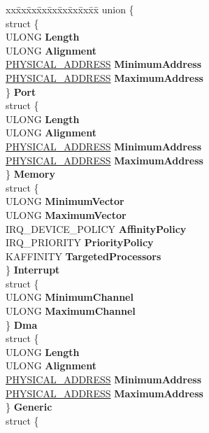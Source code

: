 \begin{DoxyCompactItemize}
\begin{tabbing}
xx\=xx\=xx\=xx\=xx\=xx\=xx\=xx\=xx\=\kill
union \{\\
\>struct \{\\
\>\>ULONG {\bfseries Length}\\
\>\>ULONG {\bfseries Alignment}\\
\>\>\hyperlink{union___l_a_r_g_e___i_n_t_e_g_e_r}{PHYSICAL\_ADDRESS} {\bfseries MinimumAddress}\\
\>\>\hyperlink{union___l_a_r_g_e___i_n_t_e_g_e_r}{PHYSICAL\_ADDRESS} {\bfseries MaximumAddress}\\
\>\} {\bfseries Port}\\
\>struct \{\\
\>\>ULONG {\bfseries Length}\\
\>\>ULONG {\bfseries Alignment}\\
\>\>\hyperlink{union___l_a_r_g_e___i_n_t_e_g_e_r}{PHYSICAL\_ADDRESS} {\bfseries MinimumAddress}\\
\>\>\hyperlink{union___l_a_r_g_e___i_n_t_e_g_e_r}{PHYSICAL\_ADDRESS} {\bfseries MaximumAddress}\\
\>\} {\bfseries Memory}\\
\>struct \{\\
\>\>ULONG {\bfseries MinimumVector}\\
\>\>ULONG {\bfseries MaximumVector}\\
\>\>IRQ\_DEVICE\_POLICY {\bfseries AffinityPolicy}\\
\>\>IRQ\_PRIORITY {\bfseries PriorityPolicy}\\
\>\>KAFFINITY {\bfseries TargetedProcessors}\\
\>\} {\bfseries Interrupt}\\
\>struct \{\\
\>\>ULONG {\bfseries MinimumChannel}\\
\>\>ULONG {\bfseries MaximumChannel}\\
\>\} {\bfseries Dma}\\
\>struct \{\\
\>\>ULONG {\bfseries Length}\\
\>\>ULONG {\bfseries Alignment}\\
\>\>\hyperlink{union___l_a_r_g_e___i_n_t_e_g_e_r}{PHYSICAL\_ADDRESS} {\bfseries MinimumAddress}\\
\>\>\hyperlink{union___l_a_r_g_e___i_n_t_e_g_e_r}{PHYSICAL\_ADDRESS} {\bfseries MaximumAddress}\\
\>\} {\bfseries Generic}\\
\>struct \{\\

\end{tabbing}
\end{DoxyCompactItemize}
